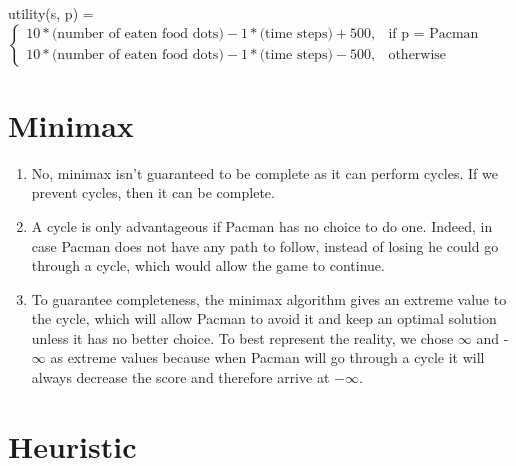 \documentclass{article}
\begin{document}
\begin{description}
\begin{center}
     utility(s, p) = $
    \left\{
    \begin{array}{ll}
        10*\text{(number of eaten food dots)} - 1*\text{(time steps)} + 500, & \text{if p = Pacman}\\
        10*\text{(number of eaten food dots)} - 1*\text{(time steps)} - 500, & \text{otherwise}
    \end{array}
    \right.$
     
\end{center}
    
     
\end{description}

\section{Minimax}

\begin{enumerate}[leftmargin=*, label=\alph*.]
    \item No, minimax isn't guaranteed to be complete as it can perform cycles. If we prevent cycles, then it can be complete.

    \item A cycle is only advantageous if Pacman has no choice to do one. Indeed, in case Pacman does not have any path to follow, instead of losing he could go through a cycle, which would allow the game to continue.
    
    \item To guarantee completeness, the minimax algorithm gives an extreme value to the cycle, which will allow Pacman to avoid it and keep an optimal solution unless it has no better choice. To best represent the reality, we chose $\infty$ and -$\infty$ as extreme values because when Pacman will go through a cycle it will always decrease the score and therefore arrive at $-\infty$.
\end{enumerate}

\section{Heuristic}
\end{document}
